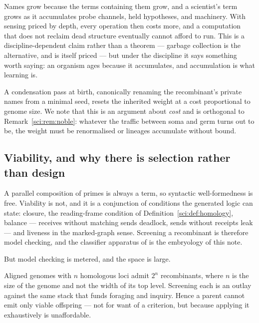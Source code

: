 \begin{remark}
\label{sci:rem:aging}
Names grow because the terms containing them grow, and a scientist's term grows as it accumulates
probe channels, held hypotheses, and machinery. With sensing priced by depth, every operation then
costs more, and a computation that does not reclaim dead structure eventually cannot afford to run.
This is a discipline-dependent claim rather than a theorem --- garbage collection is the alternative,
and is itself priced --- but under the discipline it says something worth saying: an organism ages
because it accumulates, and accumulation is what learning is.

A condensation pass at birth, canonically renaming the recombinant's private names from a minimal
seed, resets the inherited weight at a cost proportional to genome size. We note that this is an
argument about \emph{cost} and is orthogonal to Remark~\ref{sci:rem:noble}: whatever the traffic between
soma and germ turns out to be, the weight must be renormalised or lineages accumulate without bound.
\end{remark}

\subsection{Viability, and why there is selection rather than design}\label{sci:S12.8}
\label{sci:sec:viability}

A parallel composition of primes is always a term, so syntactic well-formedness is free. Viability is
not, and it is a conjunction of conditions the generated logic can state: closure, the reading-frame
condition of Definition~\ref{sci:def:homology}, balance --- receives without matching sends deadlock,
sends without receipts leak --- and liveness in the marked-graph sense. Screening a recombinant is
therefore model checking, and the classifier apparatus of \cite{ClassifierNote} is the embryology of
this note.

But model checking is metered, and the space is large.

\begin{proposition}
\label{sci:prop:selection}
Aligned genomes with $n$ homologous loci admit $2^n$ recombinants, where $n$ is the size of the genome
and not the width of its top level. Screening each is an outlay against the same stack that funds
foraging and inquiry. Hence a parent cannot emit only viable offspring --- not for want of a
criterion, but because applying it exhaustively is unaffordable.
\end{proposition}

